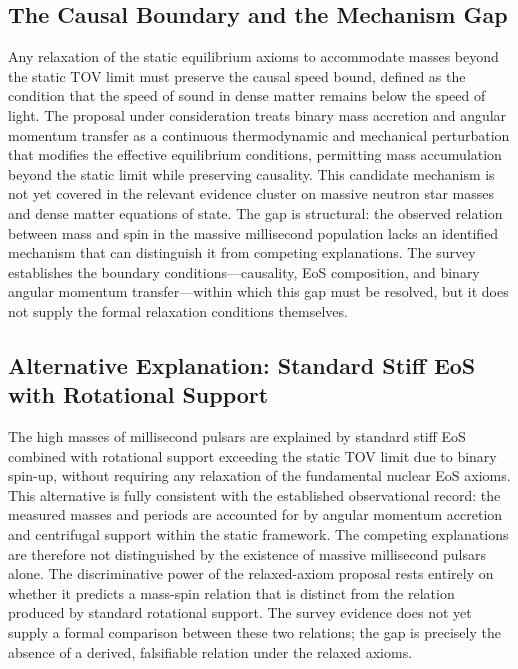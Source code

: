 \documentclass[conference]{IEEEtran}
\begin{document}
\subsection{The Causal Boundary and the Mechanism Gap}
Any relaxation of the static equilibrium axioms to accommodate masses beyond the static TOV limit must preserve the causal speed bound, defined as the condition that the speed of sound in dense matter remains below the speed of light. The proposal under consideration treats binary mass accretion and angular momentum transfer as a continuous thermodynamic and mechanical perturbation that modifies the effective equilibrium conditions, permitting mass accumulation beyond the static limit while preserving causality. This candidate mechanism is not yet covered in the relevant evidence cluster on massive neutron star masses and dense matter equations of state. The gap is structural: the observed relation between mass and spin in the massive millisecond population lacks an identified mechanism that can distinguish it from competing explanations. The survey establishes the boundary conditions---causality, EoS composition, and binary angular momentum transfer---within which this gap must be resolved, but it does not supply the formal relaxation conditions themselves.~\cite{cite_42e341ff6471ce89,cite_55957f4ce67bd972}

\subsection{Alternative Explanation: Standard Stiff EoS with Rotational Support}
The high masses of millisecond pulsars are explained by standard stiff EoS combined with rotational support exceeding the static TOV limit due to binary spin-up, without requiring any relaxation of the fundamental nuclear EoS axioms. This alternative is fully consistent with the established observational record: the measured masses and periods are accounted for by angular momentum accretion and centrifugal support within the static framework. The competing explanations are therefore not distinguished by the existence of massive millisecond pulsars alone. The discriminative power of the relaxed-axiom proposal rests entirely on whether it predicts a mass-spin relation that is distinct from the relation produced by standard rotational support. The survey evidence does not yet supply a formal comparison between these two relations; the gap is precisely the absence of a derived, falsifiable relation under the relaxed axioms.~\cite{cite_1e5d552669fc0c56,cite_55957f4ce67bd972}
\end{document}
